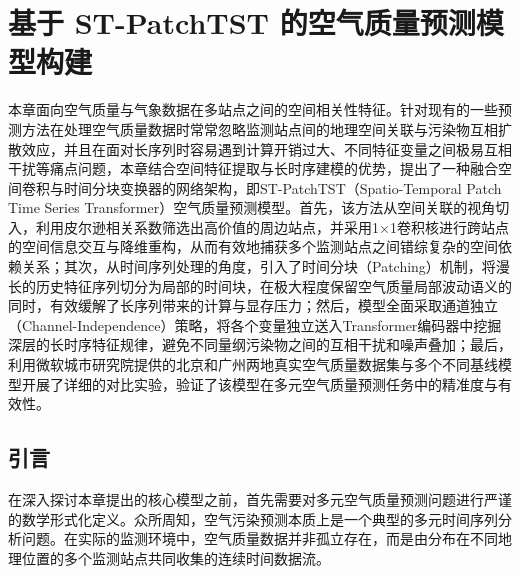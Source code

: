 
\chapter{基于 ST-PatchTST 的空气质量预测模型构建}\label{ch:3}


本章面向空气质量与气象数据在多站点之间的空间相关性特征。针对现有的一些预测方法在处理空气质量数据时常常忽略监测站点间的地理空间关联与污染物互相扩散效应，并且在面对长序列时容易遇到计算开销过大、不同特征变量之间极易互相干扰等痛点问题，本章结合空间特征提取与长时序建模的优势，提出了一种融合空间卷积与时间分块变换器的网络架构，即ST-PatchTST（Spatio-Temporal Patch Time Series Transformer）空气质量预测模型。首先，该方法从空间关联的视角切入，利用皮尔逊相关系数筛选出高价值的周边站点，并采用1×1卷积核进行跨站点的空间信息交互与降维重构，从而有效地捕获多个监测站点之间错综复杂的空间依赖关系；其次，从时间序列处理的角度，引入了时间分块（Patching）机制，将漫长的历史特征序列切分为局部的时间块，在极大程度保留空气质量局部波动语义的同时，有效缓解了长序列带来的计算与显存压力；然后，模型全面采取通道独立（Channel-Independence）策略，将各个变量独立送入Transformer编码器中挖掘深层的长时序特征规律，避免不同量纲污染物之间的互相干扰和噪声叠加；最后，利用微软城市研究院提供的北京和广州两地真实空气质量数据集与多个不同基线模型开展了详细的对比实验，验证了该模型在多元空气质量预测任务中的精准度与有效性。

\section{引言}

在深入探讨本章提出的核心模型之前，首先需要对多元空气质量预测问题进行严谨的数学形式化定义。众所周知，空气污染预测本质上是一个典型的多元时间序列分析问题。在实际的监测环境中，空气质量数据并非孤立存在，而是由分布在不同地理位置的多个监测站点共同收集的连续时间数据流。

